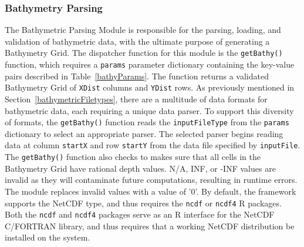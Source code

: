 \subsubsection{Bathymetry Parsing}
The Bathymetric Parsing Module is responsible for the parsing, loading, and validation of bathymetric data, with the ultimate purpose of generating a Bathymetry Grid.  The dispatcher function for this module is the \texttt{getBathy()} function, which requires a \texttt{params} parameter dictionary containing the key-value pairs described in Table~\ref{bathyParams}.  The function returns a validated Bathymetry Grid of \texttt{XDist} columns and \texttt{YDist} rows.  As previously mentioned in Section~\ref{bathymetricFiletypes}, there are a multitude of data formats for bathymetric data, each requiring a unique data parser.  To support this diversity of formats, the \texttt{getBathy()} function reads the \texttt{inputFileType} from the \texttt{params} dictionary to select an appropriate parser.  The selected parser begins reading data at column \texttt{startX} and row \texttt{startY} from the data file specified by \texttt{inputFile}.  The \texttt{getBathy()} function also checks to makes sure that all cells in the Bathymetry Grid have rational depth values.  N/A, INF, or -INF values are invalid as they will contaminate future computations, resulting in runtime errors.  The module replaces invalid values with a value of '0'.  By default, the framework supports the NetCDF type, and thus requires the \texttt{ncdf} or \texttt{ncdf4} R packages.  Both the \texttt{ncdf} and \texttt{ncdf4} packages serve as an R interface for the NetCDF C/FORTRAN library, and thus requires that a working NetCDF distribution be installed on the system.
